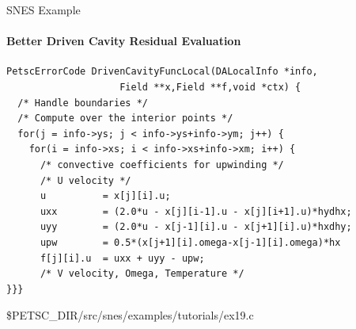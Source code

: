 \begin{frame}[fragile]{SNES Example}
\framesubtitle{Better Driven Cavity Residual Evaluation}

\small
\begin{lstlisting}
PetscErrorCode DrivenCavityFuncLocal(DALocalInfo *info,
                    Field **x,Field **f,void *ctx) {
  /* Handle boundaries */
  /* Compute over the interior points */
  for(j = info->ys; j < info->ys+info->ym; j++) {
    for(i = info->xs; i < info->xs+info->xm; i++) {
      /* convective coefficients for upwinding */
      /* U velocity */
      u          = x[j][i].u;
      uxx        = (2.0*u - x[j][i-1].u - x[j][i+1].u)*hydhx;
      uyy        = (2.0*u - x[j-1][i].u - x[j+1][i].u)*hxdhy;
      upw        = 0.5*(x[j+1][i].omega-x[j-1][i].omega)*hx
      f[j][i].u  = uxx + uyy - upw;
      /* V velocity, Omega, Temperature */
}}}
\end{lstlisting}

\begin{center}\small
\$PETSC\_DIR/src/snes/examples/tutorials/ex19.c
\end{center}
\end{frame}
